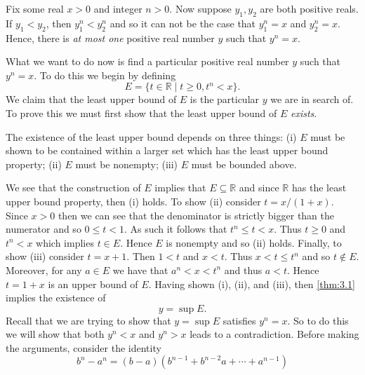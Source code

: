 \documentclass[leqno]{article}
\makeatletter
\theoremstyle{definition}
\theoremstyle{remark}
\let\oldproofname=\proofname
\renewcommand{\proofname}{\bf{\textit{\oldproofname}}}
\renewenvironment{proof}[1][\proofname]{\par
  \pushQED{\qed}%
  \normalfont \topsep6\p@\@plus6\p@\relax
  \list{}{\leftmargin=0mm
          \rightmargin=0mm
          \settowidth{\itemindent}{\itshape#1}%
          \labelwidth=4mm
          \parsep=0pt \listparindent=0mm%
  }
  \item[\hskip\labelsep
        \itshape
    #1\@addpunct{.}]\ignorespaces
}{%
  \popQED\endlist\@endpefalse
}
\makeatother
\begin{document}
            \begin{proof}
                Fix some real $x>0$ and integer $n>0$. Now suppose $y_1,y_2$ are both positive reals. If $y_1<y_2$, then $y_1^n<y_2^n$ and so it can not be the case that $y_1^n=x$ and $y_2^n=x$. Hence, there is \emph{at most one} positive real number $y$ such that $y^n=x$.\par\hspace{4mm} What we want to do now is find a particular positive real number $y$ such that $y^n=x$. To do this we begin by defining
                    \begin{equation*}
                        E=\{t\in\mathbb{R}\mid t\geq 0, t^n<x\}.
                    \end{equation*}
                We claim that the least upper bound of $E$ is the particular $y$ we are in search of. To prove this we must first show that the least upper bound of $E$ \emph{exists}. \par\hspace{4mm} The existence of the least upper bound depends on three things: (i) $E$ must be shown to be contained within a larger set which has the least upper bound property; (ii) $E$ must be nonempty; (iii) $E$ must be bounded above.\par\hspace{4mm} We see that the construction of $E$ implies that $E\subseteq\mathbb{R}$ and since $\mathbb{R}$ has the least upper bound property, then (i) holds. To show (ii) consider $t=x/(1+x)$. Since $x>0$ then we can see that the denominator is strictly bigger than the numerator and so $0\leq t<1$. As such it follows that $t^n\leq t<x$. Thus $t\geq 0$ and $t^n<x$ which implies $t\in E$. Hence $E$ is nonempty and so (ii) holds. Finally, to show (iii) consider $t=x+1$. Then $1<t$ and $x<t$. Thus $x<t\leq t^n$ and so $t\notin E$. Moreover, for any $a\in E$ we have that $a^n<x<t^n$ and thus $a<t$. Hence $t=1+x$ is an upper bound of $E$. Having shown (i), (ii), and (iii), then \cref{thm:3.1} implies the existence of 
                    \begin{equation*}
                        y=\sup E.
                    \end{equation*}
                Recall that we are trying to show that $y=\sup E$ satisfies $y^n=x$. So to do this we will show that both $y^n<x$ and $y^n>x$ leads to a contradiction. Before making the arguments, consider the identity
                    \begin{equation}
                        b^n-a^n=(b-a)(b^{n-1}+b^{n-2}a+\cdots+a^{n-1})

\end{equation}
\end{proof}
\end{document}
